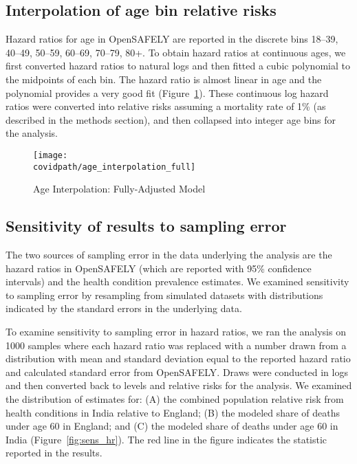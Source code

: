 \documentclass[10pt,letterpaper]{article}
\numberwithin{equation}{section}
\begin{document}
\clearpage
\subsection{Interpolation of age bin relative risks}

Hazard ratios for age in OpenSAFELY are reported in the discrete bins 18--39, 40--49, 50--59, 60--69, 70--79, 80+. To obtain hazard ratios at continuous ages, we first converted hazard ratios to natural logs and then fitted a cubic polynomial to the midpoints of each bin. The hazard ratio is almost linear in age and the polynomial provides a very good fit (Figure~\ref{fig:interp}). These continuous log hazard ratios were converted into relative risks assuming a mortality rate of 1\% (as described in the methods section), and then collapsed into integer age bins for the analysis.

\begin{figure}[H]
  \begin{center}
    \caption{Age Interpolation: Fully-Adjusted Model}
    \label{fig:interp}
    
    \texttt{[image: \\covidpath/age\_interpolation\_full]}
    
  \end{center}
\end{figure}

\clearpage
\subsection{Sensitivity of results to sampling error} 

The two sources of sampling error in the data underlying the analysis are the hazard ratios in OpenSAFELY (which are reported with 95\% confidence intervals) and the health condition prevalence estimates. We examined sensitivity to sampling error by resampling from simulated datasets with distributions indicated by the standard errors in the underlying data.

To examine sensitivity to sampling error in hazard ratios, we ran the analysis on 1000 samples where each hazard ratio was replaced with a number drawn from a distribution with mean and standard deviation equal to the reported hazard ratio and calculated standard error from OpenSAFELY. Draws were conducted in logs and then converted back to levels and relative risks for the analysis. We examined the distribution of estimates for: (A) the combined population relative risk from health conditions in India relative to England; (B) the modeled share of deaths under age 60 in England; and (C) the modeled share of deaths under age 60 in India (Figure~\ref{fig:sens_hr}). The red line in the figure indicates the statistic reported in the results.
\end{document}
